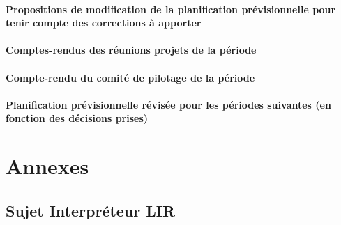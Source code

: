\documentclass[12pt,a4paper,titlepage,openany]{report}
\begin{document}
    \subsection{Propositions de modification de la planification prévisionnelle pour tenir compte des corrections à apporter}

    \subsection{Comptes-rendus des réunions projets de la période}

    \subsection{Compte-rendu du comité de pilotage de la période}

    \subsection{Planification prévisionnelle révisée pour les périodes suivantes (en fonction des décisions prises)}




    \part{Annexes}

    \appendix
    \chapter{Sujet Interpréteur LIR}

    
    
\end{document}

